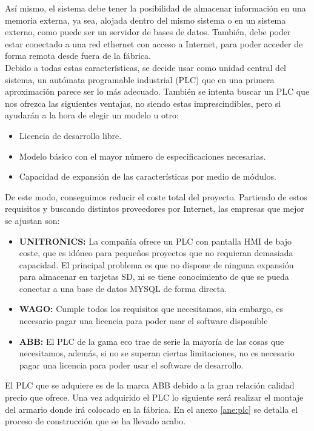 Así mismo, el sistema debe tener la posibilidad de almacenar información en una memoria externa, ya sea, alojada dentro del mismo sistema o en un sistema externo, como puede ser un servidor de bases de datos. También, debe poder estar conectado a una red ethernet con acceso a Internet, para poder acceder de forma remota desde fuera de la fábrica.\\ 

Debido a todas estas características, se decide usar como unidad central del sistema, un autómata programable industrial (PLC) que en una primera aproximación parece ser lo más adecuado. También se intenta buscar un PLC que nos ofrezca las siguientes ventajas, no siendo estas imprescindibles, pero si ayudarán a la hora de elegir un modelo u otro:

\begin{itemize}
		\item{Licencia de desarrollo libre.}
		\item{Modelo básico con el mayor número de especificaciones necesarias.}
		\item{Capacidad de expansión de las características por medio de módulos.}
\end{itemize}

De este modo, conseguimos reducir el coste total del proyecto. Partiendo de estos requisitos y buscando distintos proveedores por Internet, las empresas que mejor se ajustan son:

\begin{itemize}
		\item{\textbf{UNITRONICS:} La compañía ofrece un PLC con pantalla HMI de bajo coste, que es idóneo para pequeños proyectos que no requieran demasiada capacidad. El principal problema es que no dispone de ninguna expansión para almacenar en tarjetas SD, ni se tiene conocimiento de que se pueda conectar a una base de datos MYSQL de forma directa.}
		\item{\textbf{WAGO:} Cumple todos los requisitos que necesitamos, sin embargo, es necesario pagar una licencia para poder usar el software disponible}
		\item{\textbf{ABB:} El PLC de la gama eco trae de serie la mayoría de las cosas que necesitamos, además, si no se superan ciertas limitaciones, no es necesario pagar una licencia para poder usar el software de desarrollo.}
\end{itemize}

El PLC que se adquiere es de la marca ABB debido a la gran relación calidad precio que ofrece. Una vez adquirido el PLC lo siguiente será realizar el montaje del armario donde irá colocado en la fábrica. En el anexo \ref{ane:plc} se detalla el proceso de construcción que se ha llevado acabo.\\

